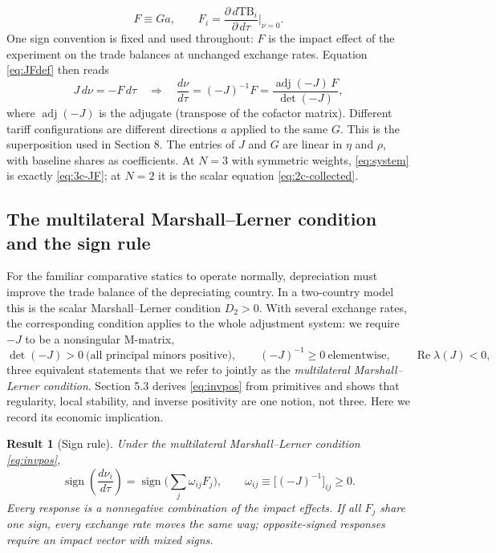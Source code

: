 \documentclass[11pt]{article}
\newtheorem{result}{Result}[section]
\begin{document}
\begin{equation}
F \equiv G a,
\qquad
F_i = \frac{\partial\, d\mathrm{TB}_i}{\partial\, d\tau}\bigg|_{\nu = 0} .
\label{eq:F-def}
\end{equation}
One sign convention is fixed and used throughout: $F$ is the impact effect of the experiment on the trade balances at unchanged exchange rates. Equation \eqref{eq:JFdef} then reads
\begin{equation}
J\, d\nu = -F\, d\tau
\quad\Longrightarrow\quad
\frac{d\nu}{d\tau} = (-J)^{-1} F = \frac{\operatorname{adj}(-J)\, F}{\det(-J)},
\label{eq:system}
\end{equation}
where $\operatorname{adj}(-J)$ is the adjugate (transpose of the cofactor matrix). Different tariff configurations are different directions $a$ applied to the same $G$. This is the superposition used in Section 8. The entries of $J$ and $G$ are linear in $\eta$ and $\rho$, with baseline shares as coefficients. At $N = 3$ with symmetric weights, \eqref{eq:system} is exactly \eqref{eq:3c-JF}; at $N = 2$ it is the scalar equation \eqref{eq:2c-collected}.

\subsection{The multilateral Marshall--Lerner condition and the sign rule}

For the familiar comparative statics to operate normally, depreciation must improve the trade balance of the depreciating country. In a two-country model this is the scalar Marshall--Lerner condition $D_2 > 0$. With several exchange rates, the corresponding condition applies to the whole adjustment system: we require $-J$ to be a nonsingular M-matrix,
\begin{equation}
\det(-J) > 0 \ \text{(all principal minors positive)},
\qquad
(-J)^{-1} \geq 0 \ \text{elementwise},
\qquad
\operatorname{Re}\lambda(J) < 0 ,
\label{eq:invpos}
\end{equation}
three equivalent statements that we refer to jointly as the \emph{multilateral Marshall--Lerner condition}. Section 5.3 derives \eqref{eq:invpos} from primitives and shows that regularity, local stability, and inverse positivity are one notion, not three. Here we record its economic implication.

\begin{result}[Sign rule]
Under the multilateral Marshall--Lerner condition \eqref{eq:invpos},
\begin{equation}
\operatorname{sign}\!\left( \frac{d\nu_i}{d\tau} \right)
= \operatorname{sign}\!\Big( \sum_j \omega_{ij} F_j \Big),
\qquad \omega_{ij} \equiv \big[(-J)^{-1}\big]_{ij} \geq 0 .
\label{eq:signrule}
\end{equation}
Every response is a nonnegative combination of the impact effects. If all $F_j$ share one sign, every exchange rate moves the same way; opposite-signed responses require an impact vector with mixed signs.
\end{result}
\end{document}
